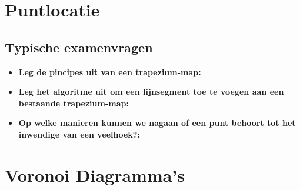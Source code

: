 \documentclass[12pt,a4paper]{article}
\begin{document}
	
	\section{Puntlocatie}
	\subsection{Typische examenvragen}
	\begin{itemize}
		\item \textbf{Leg de pincipes uit van een trapezium-map:}\\
		\item \textbf{Leg het algoritme uit om een lijnsegment toe te voegen aan een bestaande trapezium-map:}\\
		\item \textbf{Op welke manieren kunnen we nagaan of een punt behoort tot het inwendige van een veelhoek?:}\\
	\end{itemize}
	
	
	\section{Voronoi Diagramma's}
\end{document}
